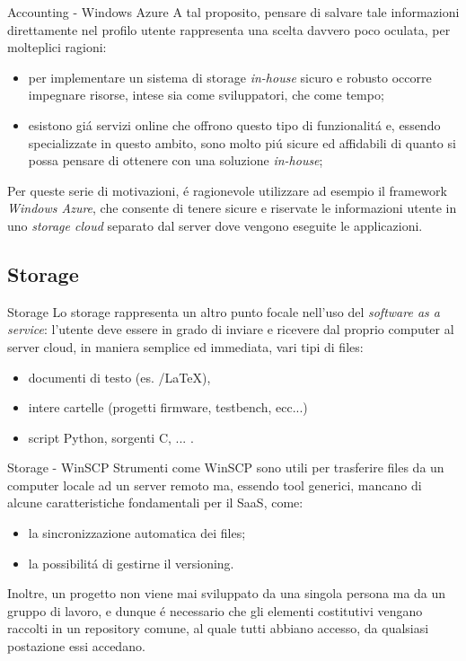 \documentclass{beamer}
\begin{document}
\begin{frame}{Accounting - Windows Azure}
A tal proposito, pensare di salvare tale informazioni direttamente nel profilo utente rappresenta una scelta davvero poco
oculata, per molteplici ragioni:
\begin{itemize}
\item per implementare un sistema di storage \emph{in-house} sicuro e robusto occorre impegnare risorse, intese sia come
sviluppatori, che come tempo;
\item esistono gi\'a servizi online che offrono questo tipo di funzionalit\'a e, essendo specializzate in questo ambito, sono
molto pi\'u sicure ed affidabili di quanto si possa pensare di ottenere con una soluzione \emph{in-house};
\end{itemize}
Per queste serie di motivazioni, \'e ragionevole utilizzare ad esempio il framework \emph{Windows Azure}, che consente di tenere sicure e riservate
le informazioni utente in uno \textit{storage cloud} separato dal server dove vengono eseguite le applicazioni.
\end{frame}


\subsection{Storage}
\begin{frame}{Storage}
Lo storage rappresenta un altro punto focale nell'uso del \textit{software as a service}: l'utente deve essere in grado di inviare
 e ricevere dal proprio computer al server cloud, in
 maniera semplice ed immediata, vari tipi di files: 
\begin{itemize}
\item documenti di testo (es. /\LaTeX), 
\item intere cartelle (progetti firmware, testbench, ecc...)
\item script Python, sorgenti C, ... .
\end{itemize}
\end{frame}

\begin{frame}{Storage - WinSCP}
Strumenti come WinSCP sono utili per trasferire files da un computer locale ad un server remoto ma, essendo tool generici,
mancano di alcune caratteristiche fondamentali per il SaaS, come:
\begin{itemize}
\item la sincronizzazione automatica dei files; 
\item la possibilit\'a di gestirne il versioning.
\end{itemize}
Inoltre, un progetto non viene mai sviluppato da una singola persona ma da un gruppo di lavoro,
 e dunque \'e necessario che gli elementi costitutivi vengano raccolti in un repository comune, al quale tutti abbiano accesso, da
 qualsiasi postazione essi accedano.
\end{frame}
\end{document}
